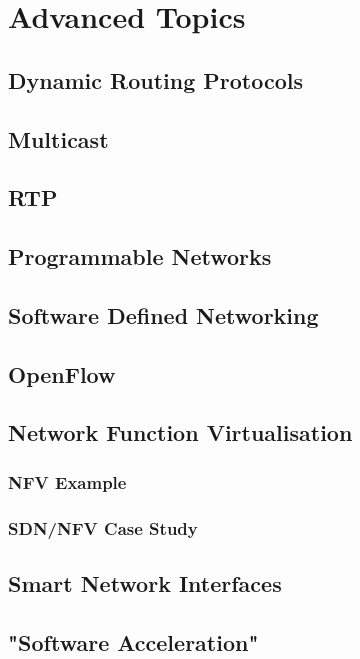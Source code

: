 \section{Advanced Topics}

\subsection{Dynamic Routing Protocols}

\subsection{Multicast}

\subsection{RTP}

\subsection{Programmable Networks}

\subsection{Software Defined Networking}

\subsection{OpenFlow}

\subsection{Network Function Virtualisation}

\subsubsection{NFV Example}

\subsubsection{SDN/NFV Case Study}

\subsection{Smart Network Interfaces}

\subsection{"Software Acceleration"}

